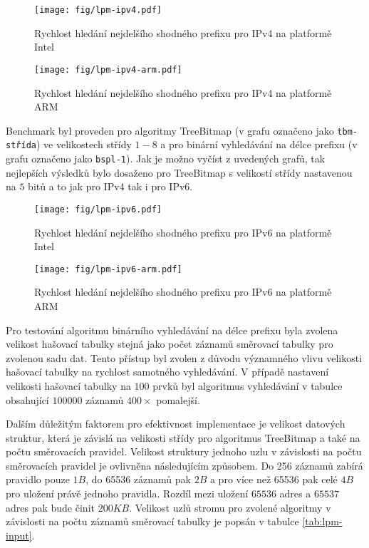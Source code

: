 \begin{figure}[H]
	\centering
	\texttt{[image: fig/lpm-ipv4.pdf]}
	\caption{Rychlost hledání nejdelšího shodného prefixu pro IPv4 na platformě Intel}
    \label{fig:lpm-ipv4}
\end{figure}

\begin{figure}[H]
    \centering
    \texttt{[image: fig/lpm-ipv4-arm.pdf]}
    \caption{Rychlost hledání nejdelšího shodného prefixu pro IPv4 na platformě ARM}
    \label{fig:lpm-ipv4-arm}
\end{figure}

Benchmark byl proveden pro algoritmy TreeBitmap (v grafu označeno jako \texttt{tbm-střída}) ve velikostech střídy $1-8$ a pro binární vyhledávání na délce prefixu (v grafu označeno jako \texttt{bspl-1}).
Jak je možno vyčíst z uvedených grafů, tak nejlepších výsledků bylo dosaženo pro TreeBitmap s velikostí
střídy nastavenou na $5$ bitů a to jak pro IPv4 tak i pro IPv6.

\begin{figure}[!htbp]
	\centering
	\texttt{[image: fig/lpm-ipv6.pdf]}
	\caption{Rychlost hledání nejdelšího shodného prefixu pro IPv6 na platformě Intel}
    \label{fig:lpm-ipv6}
\end{figure}

\begin{figure}[!htbp]
    \centering
    \texttt{[image: fig/lpm-ipv6-arm.pdf]}
    \caption{Rychlost hledání nejdelšího shodného prefixu pro IPv6 na platformě ARM}
    \label{fig:lpm-ipv6-arm}
\end{figure}

Pro testování algoritmu binárního vyhledávání na délce prefixu byla zvolena velikost hašovací tabulky
stejná jako počet záznamů směrovací tabulky pro zvolenou sadu dat. Tento přístup byl zvolen z důvodu významného vlivu
velikosti hašovací tabulky na rychlost samotného vyhledávání.
V případě nastavení velikosti hašovací tabulky na $100$ prvků byl algoritmus vyhledávání v tabulce obsahující
 $100 000$ záznamů $400\times$ pomalejší.


Dalším důležitým faktorem pro efektivnost implementace je velikost datových struktur, která je
závislá na velikosti střídy pro algoritmus TreeBitmap a také na počtu směrovacích pravidel.
Velikost struktury jednoho uzlu v závislosti na počtu směrovacích pravidel je ovlivněna následujícím způsobem.
Do 256 záznamů zabírá pravidlo pouze $1B$, do 65536 záznamů pak $2B$ a pro více než 65536 pak celé $4B$ pro uložení právě jednoho pravidla. Rozdíl mezi uložení $65536$ adres a $65537$ adres pak bude činit
$200KB$. Velikost uzlů stromu pro zvolené algoritmy v závislosti na počtu záznamů směrovací tabulky
je popsán v tabulce \ref{tab:lpm-input}.


